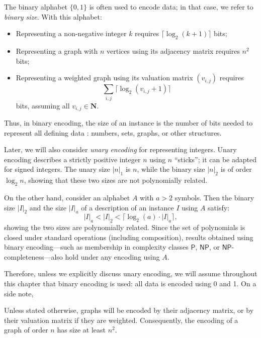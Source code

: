 The binary alphabet \( \{0, 1\} \) is often used to encode data; in that case, we refer to \emph{binary size}. With this alphabet:
\begin{itemize}
    \item Representing a non-negative integer \( k \) requires \( \lceil \log_2(k+1) \rceil \) bits;
    \item Representing a graph with \( n \) vertices using its adjacency matrix requires \( n^2 \) bits;
    \item Representing a weighted graph using its valuation matrix \( (v_{i,j}) \) requires
    \[
        \sum_{i,j} \lceil \log_2(v_{i,j} + 1) \rceil
    \]
    bits, assuming all \( v_{i,j} \in \mathbf N \).
\end{itemize}

Thus, in binary encoding, the size of an instance is the number of bits needed to represent all defining data : numbers, sets, graphs, or other structures.

Later, we will also consider \emph{unary encoding} for representing integers. Unary encoding describes a strictly positive integer \( n \) using \( n \) ``sticks''; it can be adapted for signed integers. The unary size \( |n|_1 \) is \( n \), while the binary size \( |n|_2 \) is of order \( \log_2 n \), showing that these two sizes are not polynomially related.

On the other hand, consider an alphabet \( A \) with \( a > 2 \) symbols. Then the binary size \( |I|_2 \) and the size \( |I|_a \) of a description of an instance \( I \) using \( A \) satisfy:
\[
|I|_a < |I|_2 < \lceil \log_2(a) \cdot |I|_a \rceil,
\]
showing the two sizes are polynomially related. Since the set of polynomials is closed under standard operations (including composition), results obtained using binary encoding—such as membership in complexity classes \( \mathsf{P} \), \( \mathsf{NP} \), or \( \mathsf{NP} \)-completeness—also hold under any encoding using \( A \).

Therefore, unless we explicitly discuss unary encoding, we will assume throughout this chapter that binary encoding is used: all data is encoded using 0 and 1. On a side note, \cite{}

Unless stated otherwise, graphs will be encoded by their adjacency matrix, or by their valuation matrix if they are weighted. Consequently, the encoding of a graph of order \( n \) has size at least \( n^2 \).

